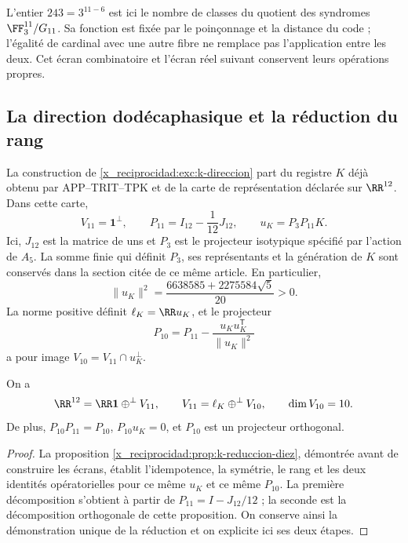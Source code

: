 L’entier \(243=3^{11-6}\) est ici le nombre de classes
du quotient des syndromes \(\FF_3^{11}/G_{11}\). Sa
fonction est fixée par le poinçonnage et la distance du
code ; l’égalité de cardinal avec une autre fibre ne remplace pas
l’application entre les deux. Cet écran combinatoire et
l’écran réel suivant conservent leurs opérations propres.

\subsection{La direction dodécaphasique et la réduction du rang}

La construction de \ref{x_reciprocidad:exc:k-direccion} part du registre
\(K\) déjà obtenu par APP--TRIT--TPK et de la carte de
représentation déclarée sur \(\RR^{12}\). Dans cette carte,
\begin{equation}
 V_{11}=\mathbf1^\perp,\qquad
 P_{11}=I_{12}-\frac1{12}J_{12},\qquad
 u_K=P_3P_{11}K.
 \label{x_reciprocidad:iv:eq:p11-uk}
\end{equation}
Ici, \(J_{12}\) est la matrice de uns et \(P_3\) est le
projecteur isotypique spécifié par l’action de \(A_5\).
La somme finie qui définit \(P_3\), ses représentants et la
génération de \(K\) sont conservés dans la section citée de
ce même article. En particulier,
\[
 \|u_K\|^2=\frac{6638585+2275584\sqrt5}{20}>0.
\]
La norme positive définit \(\ell_K=\RR u_K\), et le
projecteur
\begin{equation}
 P_{10}=P_{11}-\frac{u_Ku_K^{\mathsf T}}{\|u_K\|^2}
 \label{x_reciprocidad:iv:eq:p10}
\end{equation}
a pour image \(V_{10}=V_{11}\cap u_K^\perp\).

\begin{proposition}
\label{x_reciprocidad:iv:prop:12-11-10}
On a
\[
 \RR^{12}=\RR\mathbf1\mathbin{\oplus^\perp}V_{11},\qquad
 V_{11}=\ell_K\mathbin{\oplus^\perp}V_{10},\qquad
 \dim V_{10}=10.
\]
De plus, \(P_{10}P_{11}=P_{10}\), \(P_{10}u_K=0\), et
\(P_{10}\) est un projecteur orthogonal.
\end{proposition}
\begin{proof}
La proposition \ref{x_reciprocidad:prop:k-reduccion-diez}, démontrée avant de
construire les écrans, établit l’idempotence, la symétrie, le rang et
les deux identités opératorielles pour ce même \(u_K\) et ce même
\(P_{10}\). La première décomposition s’obtient à partir de
\(P_{11}=I-J_{12}/12\) ; la seconde est la décomposition orthogonale
de cette proposition. On conserve ainsi la démonstration unique de la
réduction et on explicite ici ses deux étapes.
\end{proof}

